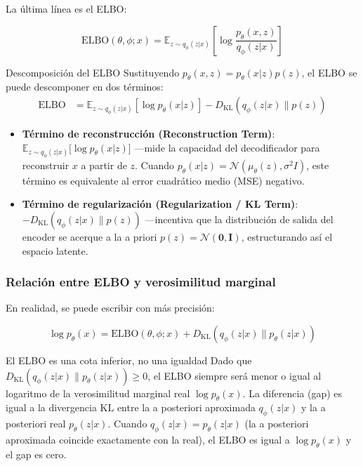 \documentclass[a4paper]{article}
\begin{document}
La última línea es el ELBO:

$$\text{ELBO}(\theta, \phi; x) = \mathbb{E}_{z \sim q_\phi(z|x)} \left[\log \frac{p_\theta(x, z)}{q_\phi(z|x)}\right]$$

\begin{importantbox}{Descomposición del ELBO}
Sustituyendo $p_\theta(x, z) = p_\theta(x|z)p(z)$, el ELBO se puede descomponer en dos términos:
\begin{align}
\text{ELBO} &= \mathbb{E}_{z \sim q_\phi(z|x)} \left[\log p_\theta(x|z)\right] - D_{\mathrm{KL}}(q_\phi(z|x) \| p(z)) \nonumber
\end{align}
\begin{itemize}
    \item \textbf{Término de reconstrucción (Reconstruction Term)}: $\mathbb{E}_{z \sim q_\phi(z|x)} {[}\log p_\theta(x|z){]}$ —mide la capacidad del decodificador para reconstruir $x$ a partir de $z$. Cuando $p_\theta(x|z) = \mathcal{N}(\mu_\theta(z), \sigma^2 I)$, este término es equivalente al error cuadrático medio (MSE) negativo.
    \item \textbf{Término de regularización (Regularization / KL Term)}: $-D_{\mathrm{KL}}(q_\phi(z|x) \| p(z))$ —incentiva que la distribución de salida del encoder se acerque a la a priori $p(z) = \mathcal{N}(\mathbf{0}, \mathbf{I})$, estructurando así el espacio latente.
\end{itemize}
\end{importantbox}

\subsubsection{Relación entre ELBO y verosimilitud marginal}

En realidad, se puede escribir con más precisión:

$$\log p_\theta(x) = \text{ELBO}(\theta, \phi; x) + D_{\mathrm{KL}}(q_\phi(z|x) \| p_\theta(z|x))$$

\begin{warningbox}{El ELBO es una cota inferior, no una igualdad}
Dado que $D_{\mathrm{KL}}(q_\phi(z|x) \| p_\theta(z|x)) \geq 0$, el ELBO siempre será menor o igual al logaritmo de la verosimilitud marginal real $\log p_\theta(x)$. La diferencia (gap) es igual a la divergencia KL entre la a posteriori aproximada $q_\phi(z|x)$ y la a posteriori real $p_\theta(z|x)$. Cuando $q_\phi(z|x) = p_\theta(z|x)$ (la a posteriori aproximada coincide exactamente con la real), el ELBO es igual a $\log p_\theta(x)$ y el gap es cero.
\end{warningbox}
\end{document}
